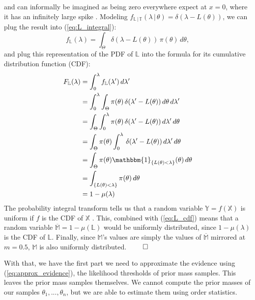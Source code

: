 \documentclass[12pt, a4paper]{report}
\begin{document}
and can informally be imagined as being zero everywhere expect at $x=0$, where it has an infinitely large spike \cite[600]{mckay}.
Modeling $f_{\mathbb{L} \,|\, \mathbb{T}}(\lambda \,|\, \theta) = \delta(\lambda - L(\theta))$, we can plug the result into (\ref{eq:L_integral}):
\begin{equation*}
    f_\mathbb{L}(\lambda) = \int_\Theta \delta(\lambda - L(\theta)) \, \pi(\theta) \, d\theta,
\end{equation*}
and plug this representation of the PDF of $\mathbb{L}$ into the formula for its cumulative distribution function (CDF):
\begin{align}
    F_\mathbb{L}(\lambda) &= \int_0^\lambda f_\mathbb{L}(\lambda') \, d\lambda' \nonumber\\
    &= \int_0^\lambda \int_\Theta \pi(\theta) \, \delta(\lambda' - L(\theta)) \, d\theta \, d\lambda' \nonumber\\
    &= \int_\Theta \int_0^\lambda \pi(\theta) \, \delta(\lambda' - L(\theta)) \, d\lambda'\, d\theta \\
    &= \int_\Theta \pi(\theta) \int_0^\lambda \, \delta(\lambda' - L(\theta)) \, d\lambda' \, d\theta \nonumber\\
    &= \int_\Theta \pi(\theta) \mathbbm{1}_{\{L(\theta) < \lambda\}}(\theta) \, d\theta \\
    &= \int_{\{L(\theta) < \lambda\}} \pi(\theta) \, d\theta \nonumber\\
    &= 1 - \mu(\lambda) \label{eq:L_cdf}
\end{align}
The probability integral transform tells us that a random variable $\mathbb{Y} = f(\mathbb{X})$ is uniform if $f$ is the CDF of $\mathbb{X}$ \cite[54]{casellaberger}.
This, combined with (\ref{eq:L_cdf}) means that a random variable $\overline{\mathbb{M}} = 1 - \mu(\mathbb{L})$ would be uniformly distributed, since $1 - \mu(\lambda)$ is the CDF of $\mathbb{L}$.
Finally, since $\mathbb{M}$'s values are simply the values of $\overline{\mathbb{M}}$ mirrored at $m = 0.5$, $\mathbb{M}$ is also uniformly distributed.
\hfill $\qed$

With that, we have the first part we need to approximate the evidence using (\ref{eq:approx_evidence}), the likelihood thresholds of prior mass samples.
This leaves the prior mass samples themselves.
We cannot compute the prior masses of our samples $\theta_1, ... ,\theta_n$, but we are able to estimate them using order statistics.
\end{document}
